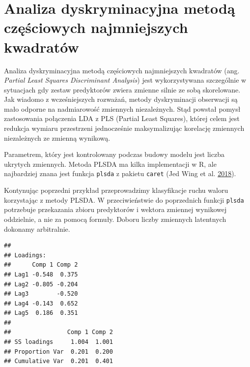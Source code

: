 \documentclass[
]{book}
\newenvironment{Shaded}{\begin{snugshade}}{\end{snugshade}}
\newcommand{\DataTypeTok}[1]{\textcolor[rgb]{0.13,0.29,0.53}{#1}}
\newcommand{\DecValTok}[1]{\textcolor[rgb]{0.00,0.00,0.81}{#1}}
\newcommand{\KeywordTok}[1]{\textcolor[rgb]{0.13,0.29,0.53}{\textbf{#1}}}
\newcommand{\NormalTok}[1]{#1}
\newcommand{\OperatorTok}[1]{\textcolor[rgb]{0.81,0.36,0.00}{\textbf{#1}}}
\newcommand{\StringTok}[1]{\textcolor[rgb]{0.31,0.60,0.02}{#1}}
\theoremstyle{plain}
\theoremstyle{definition}
\theoremstyle{definition}
\theoremstyle{definition}
\theoremstyle{definition}
\theoremstyle{remark}
\let\BeginKnitrBlock\begin \let\EndKnitrBlock\end
\begin{document}
\hypertarget{analiza-dyskryminacyjna-metodux105-czux119ux15bciowych-najmniejszych-kwadratuxf3w}{%
\section{Analiza dyskryminacyjna metodą częściowych najmniejszych kwadratów}\label{analiza-dyskryminacyjna-metodux105-czux119ux15bciowych-najmniejszych-kwadratuxf3w}}

Analiza dyskryminacyjna metodą częściowych najmniejszych kwadratów (ang. \emph{Partial Least Squares Discriminant Analysis}) jest wykorzystywana szczególnie w sytuacjach gdy zestaw predyktorów zwiera zmienne silnie ze sobą skorelowane. Jak wiadomo z wcześniejszych rozważań, metody dyskryminacji obserwacji są mało odporne na nadmiarowość zmiennych niezależnych. Stąd powstał pomysł zastosowania połączenia LDA z PLS (Partial Least Squares), której celem jest redukcja wymiaru przestrzeni jednocześnie maksymalizując korelację zmiennych niezależnych ze zmienną wynikową.

Parametrem, który jest kontrolowany podczas budowy modelu jest liczba ukrytych zmiennych. Metoda PLSDA ma kilka implementacji w R, ale najbardziej znana jest funkcja \texttt{plsda} z pakietu \texttt{caret} (Jed Wing et al. \protect\hyperlink{ref-kuhn}{2018}).

\BeginKnitrBlock{example}
\protect\hypertarget{exm:plsda}{}{\label{exm:plsda} }Kontynując poprzedni przykład przeprowadzimy klasyfikacje ruchu waloru korzystając z metody PLSDA. W przeciwieństwie do poprzednich funkcji \texttt{plsda} potrzebuje przekazania zbioru predyktorów i wektora zmiennej wynikowej oddzielnie, a nie za pomocą formuły. Doboru liczby zmiennych latentnych dokonamy arbitralnie.
\EndKnitrBlock{example}

\begin{Shaded}
\end{Shaded}

\begin{verbatim}
## 
## Loadings:
##      Comp 1 Comp 2
## Lag1 -0.548  0.375
## Lag2 -0.805 -0.204
## Lag3        -0.520
## Lag4 -0.143  0.652
## Lag5  0.186  0.351
## 
##                Comp 1 Comp 2
## SS loadings     1.004  1.001
## Proportion Var  0.201  0.200
## Cumulative Var  0.201  0.401
\end{verbatim}
\end{document}
